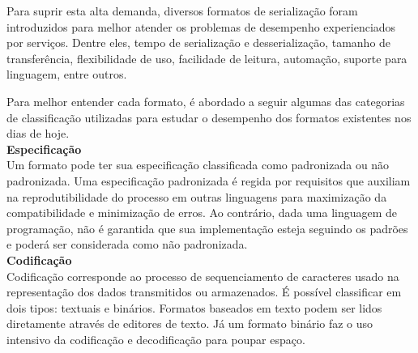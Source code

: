 Para suprir esta alta demanda, diversos formatos de serialização foram introduzidos para melhor atender os problemas de desempenho experienciados por serviços. Dentre eles, tempo de serialização e desserialização, tamanho de transferência, flexibilidade de uso, facilidade de leitura, automação, suporte para linguagem, entre outros. \cite{Guller2016}

\begin{table}[ht!]
  \centering
  \caption{Comparação de formatos de serialização}
\end{table}

Para melhor entender cada formato, é abordado a seguir algumas das categorias de classificação utilizadas para estudar o desempenho dos formatos existentes nos dias de hoje. \\

\textbf{Especificação} \\

Um formato pode ter sua especificação classificada como padronizada ou não padronizada. Uma especificação padronizada é regida por requisitos que auxiliam na reprodutibilidade do processo em outras linguagens para maximização da compatibilidade e minimização de erros. Ao contrário, dada uma linguagem de programação, não é garantida que sua implementação esteja seguindo os padrões e poderá ser considerada como não padronizada. \cite{McDermid1991} \\

\textbf{Codificação} \\

Codificação corresponde ao processo de sequenciamento de caracteres usado na representação dos dados transmitidos ou armazenados. É possível classificar em dois tipos: textuais e binários. Formatos baseados em texto podem ser lidos diretamente através de editores de texto. Já um formato binário faz o uso intensivo da codificação e decodificação para poupar espaço. \cite{Queiros2014} \\

